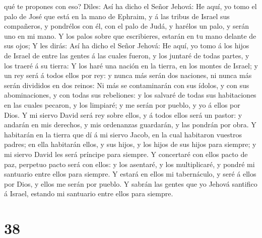 qué te propones con eso?  Diles: Así ha dicho el Señor
Jehová: He aquí, yo tomo el palo de José que está en la mano de Ephraim,
y á las tribus de Israel sus compañeros, y pondrélos con él, con el palo
de Judá, y harélos un palo, y serán uno en mi mano.  Y
los palos sobre que escribieres, estarán en tu mano delante de sus ojos;
 Y les dirás: Así ha dicho el Señor Jehová: He aquí, yo
tomo á los hijos de Israel de entre las gentes á las cuales fueron, y
los juntaré de todas partes, y los traeré á su tierra:  Y
los haré una nación en la tierra, en los montes de Israel; y un rey será
á todos ellos por rey: y nunca más serán dos naciones, ni nunca más
serán divididos en dos reinos:  Ni más se contaminarán
con sus ídolos, y con sus abominaciones, y con todas sus rebeliones: y
los salvaré de todas sus habitaciones en las cuales pecaron, y los
limpiaré; y me serán por pueblo, y yo á ellos por Dios. 
Y mi siervo David será rey sobre ellos, y á todos ellos será un pastor:
y andarán en mis derechos, y mis ordenanzas guardarán, y las pondrán por
obra.  Y habitarán en la tierra que dí á mi siervo Jacob,
en la cual habitaron vuestros padres; en ella habitarán ellos, y sus
hijos, y los hijos de sus hijos para siempre; y mi siervo David les será
príncipe para siempre.  Y concertaré con ellos pacto de
paz, perpetuo pacto será con ellos: y los asentaré, y los multiplicaré,
y pondré mi santuario entre ellos para siempre.  Y estará
en ellos mi tabernáculo, y seré á ellos por Dios, y ellos me serán por
pueblo.  Y sabrán las gentes que yo Jehová santifico á
Israel, estando mi santuario entre ellos para siempre.

\hypertarget{section-37}{%
\section{38}\label{section-37}}

